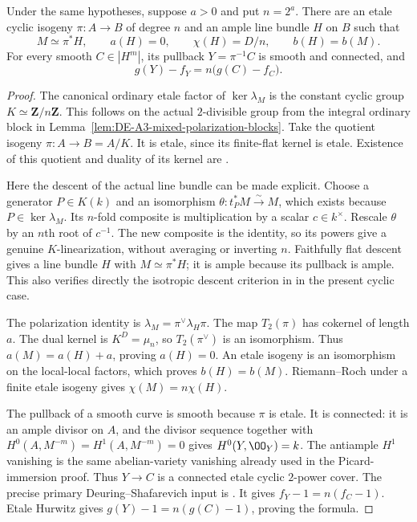 \begin{lemma}
\label{lem:DE-A3-positive-index-descent}
Under the same hypotheses, suppose $a>0$ and put $n=2^a$.
There are an etale cyclic isogeny $\pi:A\to B$ of degree $n$
and an ample line bundle $H$ on $B$ such that
\[
 M\simeq\pi^*H,\qquad a(H)=0,\qquad
 \chi(H)=D/n,\qquad b(H)=b(M).
\]
For every smooth $C\in|H^m|$, its pullback $Y=\pi^{-1}C$ is
smooth and connected, and
\[
                   g(Y)-f_Y=n\bigl(g(C)-f_C\bigr).
\]
\end{lemma}
\begin{proof}
The canonical ordinary etale factor of $\ker\lambda_M$ is the
constant cyclic group $K\simeq\mathbf Z/n\mathbf Z$.
This follows on the actual $2$-divisible group from the integral
ordinary block in
Lemma~\ref{lem:DE-A3-mixed-polarization-blocks}.
Take the quotient isogeny $\pi:A\to B=A/K$.
It is etale, since its finite-flat kernel is etale.
Existence of this quotient and duality of its kernel are
\cite[Theorem~4.38 and Example~4.40, pp.~65--66;
Theorem~7.5, p.~100]{EdixhovenVanDerGeerMoonenAV}.

Here the descent of the actual line bundle can be made explicit.
Choose a generator $P\in K(k)$ and an isomorphism
$\theta:t_P^*M\xrightarrow{\sim}M$, which exists because
$P\in\ker\lambda_M$.
Its $n$-fold composite is multiplication by a scalar $c\in k^\times$.
Rescale $\theta$ by an $n$th root of $c^{-1}$.
The new composite is the identity, so its powers give a genuine
$K$-linearization, without averaging or inverting $n$.
Faithfully flat descent gives a line bundle $H$ with
$M\simeq\pi^*H$; it is ample because its pullback is ample.
This also verifies directly the isotropic descent criterion in
\cite[Corollary~8.11 and proof, p.~117]
{EdixhovenVanDerGeerMoonenAV} in the present cyclic case.

The polarization identity is
$\lambda_M=\pi^\vee\lambda_H\pi$.
The map $T_2(\pi)$ has cokernel of length $a$.
The dual kernel is $K^D=\mu_n$, so $T_2(\pi^\vee)$ is an isomorphism.
Thus $a(M)=a(H)+a$, proving $a(H)=0$.
An etale isogeny is an isomorphism on the local-local factors,
which proves $b(H)=b(M)$.
Riemann--Roch under a finite etale isogeny gives
$\chi(M)=n\chi(H)$.

The pullback of a smooth curve is smooth because $\pi$ is etale.
It is connected: it is an ample divisor on $A$, and the divisor
sequence together with
$H^0(A,M^{-m})=H^1(A,M^{-m})=0$ gives $H^0(Y,\OO_Y)=k$.
The antiample $H^1$ vanishing is the same abelian-variety
vanishing already used in the Picard-immersion proof.
Thus $Y\to C$ is a connected etale cyclic $2$-power cover.
The precise primary Deuring--Shafarevich input is
\cite[Theorem~1.5, Corollaries~1.7--1.8, pp.~34--36,
especially equation~(1.8.2), p.~36]{Crew1984EtaleP}.
It gives $f_Y-1=n(f_C-1)$.
Etale Hurwitz gives $g(Y)-1=n(g(C)-1)$, proving the formula.


\end{proof}
